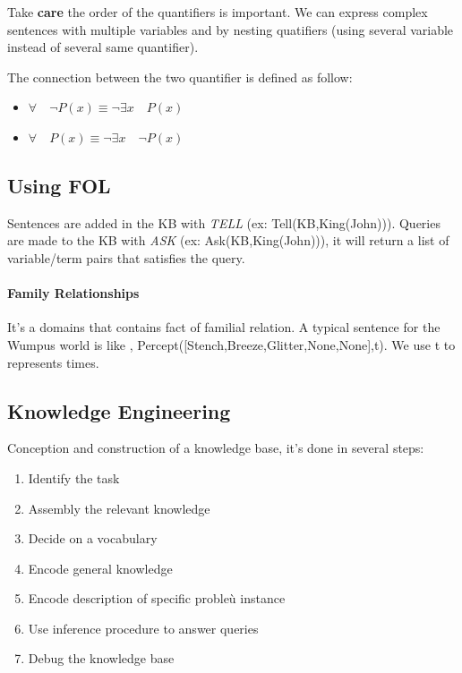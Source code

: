    Take  \textbf{care}  the  order  of  the  quantifiers is  important.  We  can
 express  complex  sentences  with  multiple variables  and  by  nesting
 quatifiers (using several variable instead of several same quantifier).

 The  connection  between  the  two quantifier  is  defined  as  follow:
 \begin{itemize}  \item $\forall\quad  \neg  P(x)  \equiv \neg\exists  x
 \quad P(x) $  \item $\forall\quad P(x) \equiv \neg\exists  x \quad \neg
 P(x)$ \end{itemize}

\subsection{Using FOL}

 Sentences   are    added   in   the   KB    with   \textit{TELL}   (ex:
 Tell(KB,King(John))). Queries are made to the KB with \textit{ASK} (ex:
 Ask(KB,King(John))), it will return a  list of variable/term pairs that
 satisfies the query.

 \paragraph{Family Relationships}  It's a domains that  contains fact of
 familial relation.  A typical sentence for  the Wumpus world is  like ,
 Percept([Stench,Breeze,Glitter,None,None],t).  We use  t to  represents
 times.

\subsection{Knowledge Engineering}

	Conception and construction of a knowledge base, it's done in several steps:
	\begin{multicols}{2}
		\begin{enumerate}
			\item Identify the task
			\item Assembly the relevant knowledge
			\item Decide on a vocabulary
			\item Encode general knowledge
			\item Encode description of specific probleù instance
			\item Use inference procedure to answer queries
			\item Debug the knowledge base
		\end{enumerate}
	\end{multicols}

